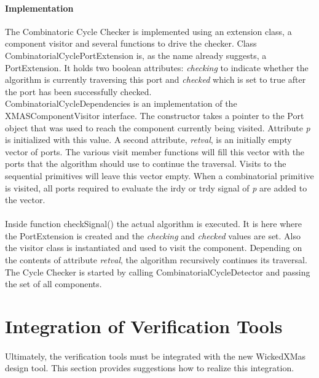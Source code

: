 \documentclass[a4paper,11pt]{article}
\begin{document}
\paragraph{Implementation}
The Combinatoric Cycle Checker is implemented using an extension class, a component visitor
and several functions to drive the checker. Class CombinatorialCyclePortExtension is, as
the name already suggests, a PortExtension. It holds two boolean attributes: \emph{checking} to
indicate whether the algorithm is currently traversing this port and \emph{checked} which is
set to true after the port has been successfully checked.\\
CombinatorialCycleDependencies is an implementation of the XMASComponentVisitor interface.
The constructor takes a pointer to the Port object that was used to reach the component
currently being visited. Attribute \emph{p} is initialized with this value. A second attribute,
\emph{retval}, is an initially empty vector of ports. The various visit member functions will
fill this vector with the ports that the algorithm should use to continue the traversal. Visits
to the sequential primitives will leave this vector empty. When a combinatorial primitive is
visited, all ports required to evaluate the irdy or trdy signal of \emph{p} are added to the vector.

\paragraph{}
Inside function checkSignal() the actual algorithm is executed. It is here where the PortExtension
is created and the \emph{checking} and \emph{checked} values are set. Also the visitor class
is instantiated and used to visit the component. Depending on the contents of attribute
\emph{retval}, the algorithm recursively continues its traversal. The Cycle Checker is started
by calling CombinatorialCycleDetector and passing the set of all components.

\newpage

\section{Integration of Verification Tools}

\paragraph{}
Ultimately, the verification tools must be integrated with the new WickedXMas design tool.
This section provides suggestions how to realize this integration.
\end{document}
